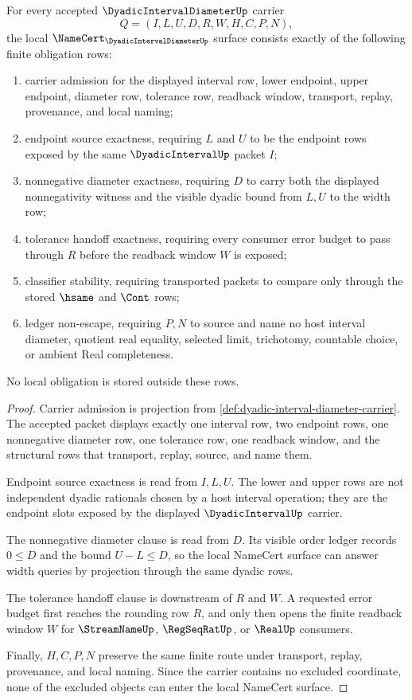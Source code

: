 \begin{theorem}
\label{thm:dyadic-interval-diameter-namecert-obligations}
For every accepted $\DyadicIntervalDiameterUp$ carrier
$$
Q=(I,L,U,D,R,W,H,C,P,N),
$$
the local $\NameCert_{\DyadicIntervalDiameterUp}$ surface consists exactly of the following finite obligation rows:
\begin{enumerate}
\item carrier admission for the displayed interval row, lower endpoint, upper endpoint, diameter row, tolerance row, readback window, transport, replay, provenance, and local naming;
\item endpoint source exactness, requiring $L$ and $U$ to be the endpoint rows exposed by the same $\DyadicIntervalUp$ packet $I$;
\item nonnegative diameter exactness, requiring $D$ to carry both the displayed nonnegativity witness and the visible dyadic bound from $L,U$ to the width row;
\item tolerance handoff exactness, requiring every consumer error budget to pass through $R$ before the readback window $W$ is exposed;
\item classifier stability, requiring transported packets to compare only through the stored $\hsame$ and $\Cont$ rows;
\item ledger non-escape, requiring $P,N$ to source and name no host interval diameter, quotient real equality, selected limit, trichotomy, countable choice, or ambient Real completeness.
\end{enumerate}
No local obligation is stored outside these rows.
\end{theorem}
\begin{proof}
Carrier admission is projection from \autoref{def:dyadic-interval-diameter-carrier}. The accepted packet displays exactly one interval row, two endpoint rows, one nonnegative diameter row, one tolerance row, one readback window, and the structural rows that transport, replay, source, and name them.

Endpoint source exactness is read from $I,L,U$. The lower and upper rows are not independent dyadic rationals chosen by a host interval operation; they are the endpoint slots exposed by the displayed $\DyadicIntervalUp$ carrier.

The nonnegative diameter clause is read from $D$. Its visible order ledger records $0\leq D$ and the bound $U-L\leq D$, so the local NameCert surface can answer width queries by projection through the same dyadic rows.

The tolerance handoff clause is downstream of $R$ and $W$. A requested error budget first reaches the rounding row $R$, and only then opens the finite readback window $W$ for $\StreamNameUp$, $\RegSeqRatUp$, or $\RealUp$ consumers.

Finally, $H,C,P,N$ preserve the same finite route under transport, replay, provenance, and local naming. Since the carrier contains no excluded coordinate, none of the excluded objects can enter the local NameCert surface.
\end{proof}

